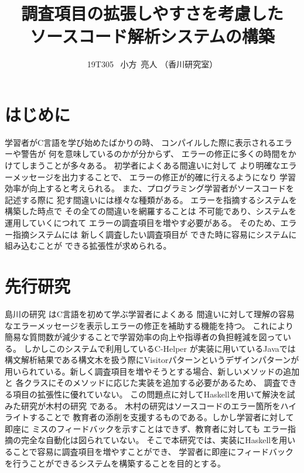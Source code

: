 \documentclass[11pt,twocolumn]{jarticle}
\begin{document}
\title{\Large 調査項目の拡張しやすさを考慮した\\ソースコード解析システムの構築}
\author{19T305 \ 小方~亮人 （香川研究室）}
%
\maketitle
\pagestyle{headings}
\thispagestyle{headings}
%
\section{はじめに}
学習者がC言語を学び始めたばかりの時、
コンパイルした際に表示されるエラーや警告が
何を意味しているのかが分からず、
エラーの修正に多くの時間をかけてしまうことが多々ある。
初学者によくある間違いに対して
より明確なエラーメッセージを出力することで、
エラーの修正が的確に行えるようになり
学習効率が向上すると考えられる。
また、プログラミング学習者がソースコードを記述する際に
犯す間違いには様々な種類がある。
エラーを指摘するシステムを構築した時点で
その全ての間違いを網羅することは
不可能であり、システムを運用していくにつれて
エラーの調査項目を増やす必要がある。
そのため、エラー指摘システムには
新しく調査したい調査項目が
できた時に容易にシステムに組み込むことが
できる拡張性が求められる。

\section{先行研究}
島川の研究 \cite{1}はC言語を初めて学ぶ学習者によくある
間違いに対して理解の容易なエラーメッセージを表示しエラーの修正を補助する機能を持つ。
これにより簡易な質問数が減少することで学習効率の向上や指導者の負担軽減を図っている。
しかしこのシステムで利用しているC-Helper \cite{2}が実装に用いているJavaでは
構文解析結果である構文木を扱う際にVisitorパターンというデザインパターンが
用いられている。新しく調査項目を増やそうとする場合、新しいメソッドの追加と
各クラスにそのメソッドに応じた実装を追加する必要があるため、
調査できる項目の拡張性に優れていない。
この問題点に対してHaskellを用いて解決を試みた研究が木村の研究 \cite{3}である。
木村の研究はソースコードのエラー箇所をハイライトすることで
教育者の添削を支援するものである。しかし学習者に対して即座に
ミスのフィードバックを示すことはできず、教育者に対しても
エラー指摘の完全な自動化は図られていない。
そこで本研究では、実装にHaskellを用いることで容易に調査項目を増やすことができ、
学習者に即座にフィードバックを行うことができるシステムを構築することを目的とする。
\end{document}
